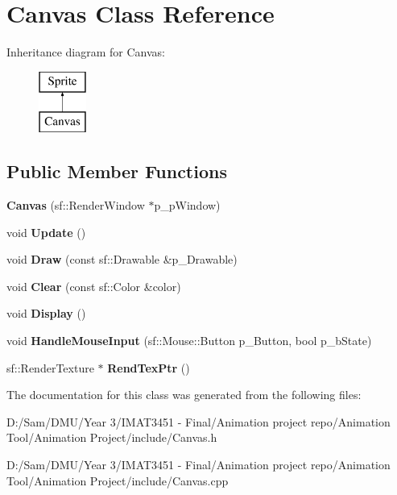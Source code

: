 \hypertarget{class_canvas}{}\section{Canvas Class Reference}
\label{class_canvas}
Inheritance diagram for Canvas\+:\begin{figure}[H]
\begin{center}
\leavevmode
\includegraphics[height=2.000000cm]{class_canvas}
\end{center}
\end{figure}
\subsection*{Public Member Functions}
\begin{DoxyCompactItemize}
\item 
\mbox{\label{class_canvas_a986afb603e6a8182bef8c45f06494221}} 
{\bfseries Canvas} (sf\+::\+Render\+Window $\ast$p\+\_\+p\+Window)
\item 
\mbox{\label{class_canvas_a201413f418eef9b0336772401ec009ee}} 
void {\bfseries Update} ()
\item 
\mbox{\label{class_canvas_a19cd4eba59f4e18830d9ac1be53210ff}} 
void {\bfseries Draw} (const sf\+::\+Drawable \&p\+\_\+\+Drawable)
\item 
\mbox{\label{class_canvas_a6fa937d64a95ad0b4510c3227e3bed3d}} 
void {\bfseries Clear} (const sf\+::\+Color \&color)
\item 
\mbox{\label{class_canvas_afc0c7c0669202f0c41fa17ecd81abb1f}} 
void {\bfseries Display} ()
\item 
\mbox{\label{class_canvas_a2c0019f93d948b0b0cd69d01862192b8}} 
void {\bfseries Handle\+Mouse\+Input} (sf\+::\+Mouse\+::\+Button p\+\_\+\+Button, bool p\+\_\+b\+State)
\item 
\mbox{\label{class_canvas_ab5e67ca2616e2ac672082a0628dc1c36}} 
sf\+::\+Render\+Texture $\ast$ {\bfseries Rend\+Tex\+Ptr} ()
\end{DoxyCompactItemize}


The documentation for this class was generated from the following files\+:\begin{DoxyCompactItemize}
\item 
D\+:/\+Sam/\+D\+M\+U/\+Year 3/\+I\+M\+A\+T3451 -\/ Final/\+Animation project repo/\+Animation Tool/\+Animation Project/include/Canvas.\+h\item 
D\+:/\+Sam/\+D\+M\+U/\+Year 3/\+I\+M\+A\+T3451 -\/ Final/\+Animation project repo/\+Animation Tool/\+Animation Project/include/Canvas.\+cpp\end{DoxyCompactItemize}
